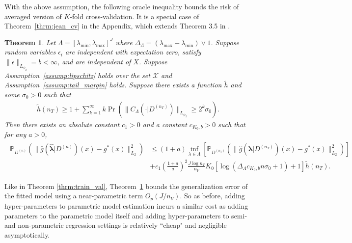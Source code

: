 \documentclass[12pt]{article} %
\newtheorem{theorem}{Theorem}
\theoremstyle{definition}
\begin{document}
With the above assumption, the following oracle inequality bounds the risk of averaged version of $K$-fold cross-validation.
It is a special case of Theorem~\ref{thrm:jean_cv} in the Appendix, which extends Theorem 3.5 in \citet{lecue2012oracle}.
\begin{theorem}
	\label{thrm:kfold}
	Let $\Lambda=[\lambda_{\min},\lambda_{\max}]^{J}$ where $\Delta_{\Lambda} = (\lambda_{\max} - \lambda_{\min}) \vee 1$.
	Suppose random variables $\epsilon_i$ are independent with expectation zero, satisfy $\|\epsilon\|_{L_{\psi_2}}= b <\infty$, and are independent of $X$.
	Suppose Assumption~\ref{assump:lipschitz} holds over the set $\mathcal{X}$ and Assumption~\ref{assump:tail_margin} holds.
	Suppose there exists a function $\tilde{h}$ and some $\sigma_0 > 0$ such that
	\begin{align}
	\tilde{h}(n_{T})
	\ge
	1 + \sum_{k=1}^{\infty}
	k\Pr\left(\|C_\Lambda(\cdot |D^{(n_{T})})\|_{L_{\psi_{2}}}\ge2^{k}\sigma_{0}\right).
	\end{align}
	Then there exists an absolute constant $c_{1}>0$ and a constant $c_{K_0, b}>0$ such that for any $a > 0$,
	\begin{align}
	\begin{split}
	\mathbb{P}_{D^{(n)}}\left(
	\|
	\bar{g}(\hat{\boldsymbol{\lambda}}|D^{(n)})(x)
	-g^{*}(x)
	\|_{L_{2}}^{2}\right)
	& \le	(1+a)
	\inf_{\lambda\in\Lambda}
	\left[\mathbb{P}_{D^{(n_{T})}}\left(\|\hat{g}(\boldsymbol{\lambda}|D^{(n_{T})})(x)-g^{*}(x)\|_{L_{2}}^{2}\right)\right] \\
	& +
	c_{1}
	\left (\frac{1+a}{a} \right )^2
	\frac{J\log n_{V}}{n_{V}}
	K_0
	\left[\log\left(\Delta_{\Lambda} c_{K_0, b} n \sigma_0 +1\right)+1\right]
	\tilde{h}(n_{T}).
	\end{split}
	\label{eq:cv_lipschitz_oracle_ineq}
	\end{align}
\end{theorem}

Like in Theorem \ref{thrm:train_val}, Theorem~\ref{thrm:kfold} bounds the generalization error of the fitted model using a near-parametric term $O_p(J/n_V)$.
So as before, adding hyper-parameters to parametric model estimation incurs a similar cost as adding parameters to the parametric model itself and adding hyper-parameters to semi- and non-parametric regression settings is relatively ``cheap" and negligible asymptotically.
\end{document}
